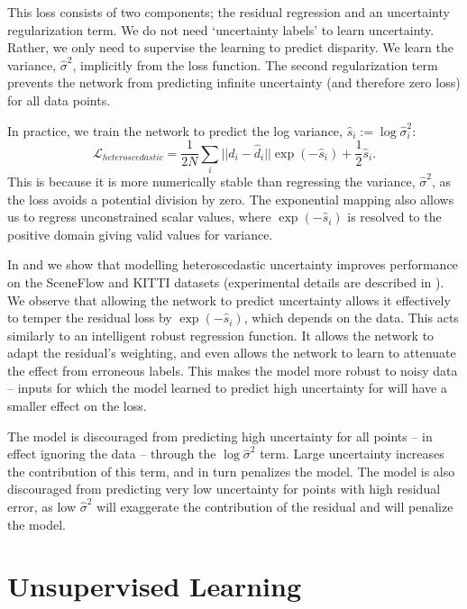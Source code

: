 This loss consists of two components; the residual regression and an uncertainty regularization term. We do not need `uncertainty labels' to learn uncertainty. Rather, we only need to supervise the learning to predict disparity. We learn the variance, $\hat{\sigma}^2$, implicitly from the loss function. The second regularization term prevents the network from predicting infinite uncertainty (and therefore zero loss) for all data points.

In practice, we train the network to predict the log variance, $\hat{s}_i := \log \hat{\sigma}_i^2$: 
\begin{equation}
\mathcal{L}_{heteroscedastic} = \frac{1}{2N} \sum_i ||d_i-\hat{d}_i|| \exp (-\hat{s}_i) + \frac{1}{2}\hat{s}_i.
\label{eqn:aleatoric_regression_loss2}
\end{equation}
This is because it is more numerically stable than regressing the variance, $\hat{\sigma}^2$, as the loss avoids a potential division by zero. The exponential mapping also allows us to regress unconstrained scalar values, where $\exp(-\hat{s}_i)$ is resolved to the positive domain giving valid values for variance.

In  and  we show that modelling heteroscedastic uncertainty improves performance on the SceneFlow and KITTI datasets (experimental details are described in ). We observe that allowing the network to predict uncertainty allows it effectively to temper the residual loss by $\exp(-\hat{s}_i)$, which depends on the data. This acts similarly to an intelligent robust regression function. It allows the network to adapt the residual's weighting, and even allows the network to learn to attenuate the effect from erroneous labels. This makes the model more robust to noisy data -- inputs for which the model learned to predict high uncertainty for will have a smaller effect on the loss.

The model is discouraged from predicting high uncertainty for all points -- in effect ignoring the data -- through the $\log \hat{\sigma}^2$ term. Large uncertainty increases the contribution of this term, and in turn penalizes the model. The model is also discouraged from predicting very low uncertainty for points with high residual error, as low $\hat{\sigma}^2$ will exaggerate the contribution of the residual and will penalize the model.

\section{Unsupervised Learning}
\label{sec:unsupervised}

